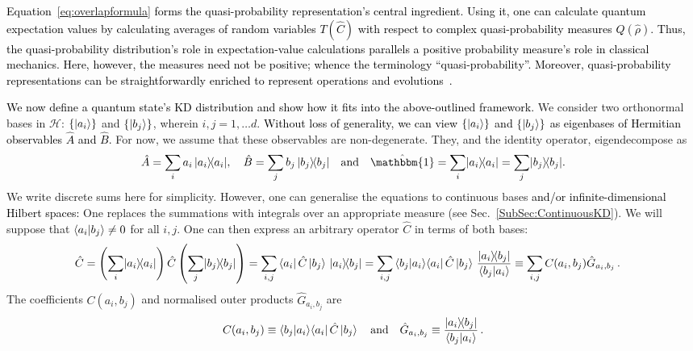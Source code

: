 \documentclass[%
 reprint,
superscriptaddress,
nofootinbib,
bibnotes,
 amsmath,amssymb,
 aps,
]{revtex4-1}
\theoremstyle{plain}
\newcommand*{\ketbra}[2]{\lvert #1 \rangle\!\langle #2 \rvert}
\newcommand{\Dave}[1]{\textcolor{black}{#1} }
\newcommand{\Stephan}[1]{\textcolor{black}{#1} }
\newcommand{\nicole}[1]{\textcolor{black}{#1} }
\begin{document}
\nicole{Equation~\eqref{eq:overlapformula} forms the \Dave{quasi-probability representation's} central ingredient. Using it, one can \Dave{calculate} quantum expectation values by calculating averages of random variables $T({\hat C})$ 
with respect to complex quasi-probability measures $Q({\hat{\rho}})$.
\Dave{Thus, the quasi-probability distribution's role in expectation-value calculations} 
parallels a positive probability measure's \Dave{role in} classical mechanics. Here, however, the measures need not be positive; whence the terminology ``quasi-probability''.  \Dave{Moreover,} quasi-probability \Dave{representations} 
can be straightforwardly enriched to represent operations and evolutions~\cite{Bartlett2015, schmid2024}. 
}

\Stephan{We now define a quantum state's KD distribution  and show how it fits into the above-outlined framework.}   
We consider two orthonormal bases in $\mathcal{H}$:  $\{ \ket{a_i} \} $ and $ \{ \ket{b_j} \}$, wherein $i,j = 1, \ldots d$.  \nicole{Without loss of generality, we can view $\{ \ket{a_i} \} $ and $ \{ \ket{b_j} \}$ as eigenbases of Hermitian observables $\hat{A}$ and $\hat{B}$.}
For now, we assume that these observables are non-degenerate. They, and the identity operator, eigendecompose as
\begin{align}\label{eq:ABobs}
    \hat{A} = \sum_i a_i \,\ketbra{a_i}{a_i}, \quad 
    \hat{B} = \sum_j b_j\,\ketbra{b_j}{b_j} \quad \text{and} \quad \hat{\mathbbm{1}} = \sum_i \ketbra{a_i}{a_i} = \sum_j \ketbra{b_j}{b_j}.
\end{align} 
We write discrete sums here for simplicity. However, one can generalise the equations to continuous bases \Stephan{and/or infinite-dimensional Hilbert spaces:} One replaces the summations with integrals over
an appropriate measure (see Sec.~\ref{SubSec:ContinuousKD}).
We will suppose that $\braket{a_i|b_j} \neq 0$ for all $i,j$. One can then express an arbitrary operator $\hat{C}$ in terms of both bases:
\begin{align}\label{eq:reconstruction1}
    \hat{C} &= \left(
    \sum_i \ketbra{a_i}{a_i}\right) \hat{C}
    \left(\sum_j\ketbra{b_j}{b_j}\right) 
    = \sum_{i,j} \bra{a_i} \hat{C} \ket{b_j}\, \ketbra{a_i}{b_j} 
    = \sum_{i,j} \braket{b_j|a_i} \!\bra{a_i}\hat{C}\ket{b_j}\, \frac{\ketbra{a_i}{b_j}}{\braket{b_j|a_i}} 
    \equiv \sum_{i,j} C(a_i,b_j) \hat{G}_{a_i,b_j} \, .
\end{align}
The coefficients $C(a_i,b_j)$ and  normalised outer products $\hat{G}_{a_i,b_j}$ are 
\begin{align}
\label{Eq:Frame}
    C(a_i,b_j) \equiv \braket{b_j|a_i}\!\bra{a_i}\hat{C}\ket{b_j}  \quad \text{and} \quad  
    \hat{G}_{a_i,b_j} \equiv \frac{\ketbra{a_i}{b_j}}{\braket{b_j|a_i}} \, .
\end{align}
\end{document}
